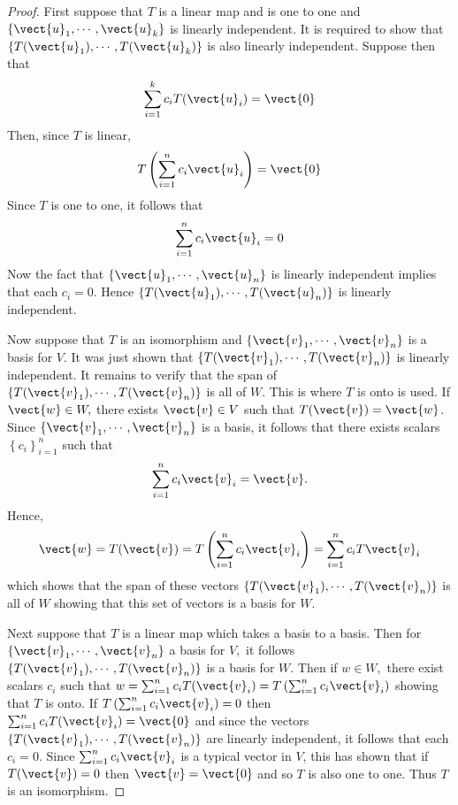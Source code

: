 \begin{proof}
First suppose that $T$ is a linear map and is one to one
and $\left\{ \vect{u}_{1},\cdots ,\vect{u}_{k}\right\} $ is linearly
independent. It is required to show that $\left\{ T(\vect{u}_{1}),\cdots ,T(\vect{u}_{k})\right\} $ is also linearly independent. Suppose then that 
\begin{equation*}
\sum_{i=1}^{k}c_{i}T(\vect{u}_{i})=\vect{0}
\end{equation*}
Then, since $T$ is linear, 
\begin{equation*}
T\left( \sum_{i=1}^{n}c_{i}\vect{u}_{i}\right) =\vect{0}
\end{equation*}
Since $T$ is one to one, it follows that 
\begin{equation*}
\sum_{i=1}^{n}c_{i}\vect{u}_{i}=0
\end{equation*}
Now the fact that $\left\{ \vect{u}_{1},\cdots ,\vect{u}_{n}\right\} $ is
linearly independent implies that each $c_{i}=0$. Hence $\left\{ T(\vect{u}
_{1}),\cdots ,T(\vect{u}_{n})\right\} $ is linearly independent.

Now suppose that $T$ is an isomorphism and $\left\{ \vect{v}_{1},\cdots ,\vect{
v}_{n}\right\} $ is a basis for $V$. It was just shown that $\left\{ T(\vect{v}
_{1}),\cdots ,T(\vect{v}_{n})\right\} $ is linearly independent. It remains to
verify that the span of $\left\{ T(\vect{v}_{1}),\cdots ,T(\vect{v}_{n})\right\} $
is all of $W$. This is where $T$ is onto is used. If $\vect{w}\in W,$ there
exists $\vect{v}\in V$ such that $T(\vect{v})=\vect{w}$. Since $\left\{ \vect{v}
_{1},\cdots ,\vect{v}_{n}\right\} $ is a basis, it follows that there exists
scalars $\left\{ c_{i}\right\} _{i=1}^{n}$ such that 
\begin{equation*}
\sum_{i=1}^{n}c_{i}\vect{v}_{i}=\vect{v}.
\end{equation*}
Hence, 
\begin{equation*}
\vect{w}=T(\vect{v})=T\left( \sum_{i=1}^{n}c_{i}\vect{v}_{i}\right)
=\sum_{i=1}^{n}c_{i}T\vect{v}_{i}
\end{equation*}
which shows that the span of these vectors $\left\{ T(\vect{v}_{1}),\cdots ,T
(\vect{v}_{n})\right\} $ is all of $W$ showing that this set of vectors is a
basis for $W$.

Next suppose that $T$ is a linear map which takes a basis to a basis. Then
for $\left\{ \vect{v}_{1},\cdots ,\vect{v}_{n}\right\} $ a basis for $V,$ it
follows $\left\{ T(\vect{v}_{1}),\cdots ,T(\vect{v}_{n})\right\} $ is a basis for $
W.$ Then if $w\in W,$ there exist scalars $c_{i}$ such that $
w=\sum_{i=1}^{n}c_{i}T(\vect{v}_{i})=T\left( \sum_{i=1}^{n}c_{i}\vect{v}_{i}\right) $
showing that $T$ is onto. If $T\left( \sum_{i=1}^{n}c_{i}\vect{v}_{i}\right) =0$
then $\sum_{i=1}^{n}c_{i}T(\vect{v}_{i})=\vect{0}$ and since the vectors $\left\{ T(\vect{v}
_{1}),\cdots ,T(\vect{v}_{n})\right\} $ are linearly independent, it follows
that each $c_{i}=0.$ Since $\sum_{i=1}^{n}c_{i}\vect{v}_{i}$ is a typical vector in 
$V$, this has shown that if $T(\vect{v})=0$ then $\vect{v}=\vect{0}$ and so $T$ is also one to one.
Thus $T$ is an isomorphism.
\end{proof}


